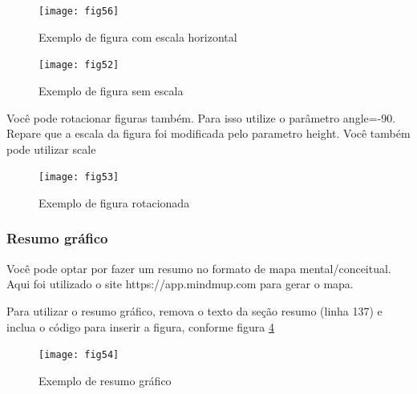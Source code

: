\documentclass[	DIV=calc,%
paper=a4,%
fontsize=12pt,%
onecolumn]{scrartcl}	 					%
\begin{document}
	\begin{figure}
		\centering
		\texttt{[image: fig56]}
		\caption{Exemplo de figura com escala horizontal}
		\label{fig56}
	\end{figure}
	
	
	\begin{figure}
		\centering
		\texttt{[image: fig52]}
		\caption{Exemplo de figura sem escala}
		\label{fig52}
	\end{figure}
	
	Você pode rotacionar figuras também. Para isso utilize o parâmetro angle=-90. Repare que a escala da figura foi modificada pelo parametro height. Você também pode utilizar scale
	
	\begin{figure}
		\centering
		\texttt{[image: fig53]}
		\caption{Exemplo de figura rotacionada}
		\label{fig53}
	\end{figure}
	
	\subsubsection{Resumo gráfico}
	
	Você pode optar por fazer um resumo no formato de mapa mental/conceitual. 
	Aqui foi utilizado o site https://app.mindmup.com para gerar o mapa.
	
	Para utilizar o resumo gráfico, remova o texto da seção resumo (linha 137) e inclua o código para inserir a figura, conforme figura \ref{fig54}
	
	\begin{figure}[h]
		\centering
		\texttt{[image: fig54]}
		\caption{Exemplo de resumo gráfico}
		\label{fig54}	
	\end{figure}
	
	
\end{document}

